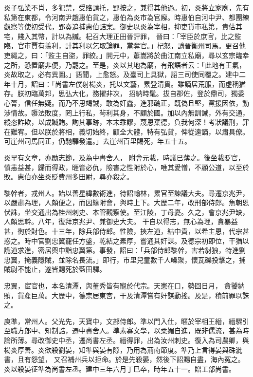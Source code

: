\begin{pinyinscope}
 炎子弘業不肖，多犯禁，受賂請托，郢按之，兼得其他過。初，炎將立家廟，先有私第在東都，令河南尹趙惠伯貨之，惠伯為炎市為官廨。時惠伯自河中尹、都團練觀察等使初受代，郢奏追捕惠伯詰案。御史以炎為宰相，抑吏貨市私第，貴估其宅，賤入其幣，計以為贓。杞召大理正田晉評罪，
 晉曰：「宰臣於庶官，比之監臨，官市賈有羨利，計其利以乞取論罪，當奪官。」杞怒，謫晉衡州司馬。更召他吏繩之，曰：「監主自盜，罪絞。」開元中，蕭嵩將於曲江南立私廟，尋以玄宗臨幸之所，恐置廟非便，乃罷之。至是，炎以其地為廟，有飛語者云：「此地有王氣，炎故取之，必有異圖。」語聞，上愈怒。及臺司上具獄，詔三司使同覆之。建中二年十月，詔曰：「尚書左僕射楊炎，托以文藝，累登清貫。雖謫居荒服，而虛稱猶存。朕初臨萬邦，思弘大化，務擢非次，
 招納時髦。拔自郡佐，登於鼎司，獨委心膂，信任無疑。而乃不思竭誠，敢為奸蠹，進邪醜正，既偽且堅，黨援因依，動涉情故。隳法敗度，罔上行私，茍利其身，不顧於國。加以內無訓誡，外有交通，縱恣詐欺，以成贓賄。詢其事跡，本末乖謬，蔑恩棄德，負我何深！考狀議刑，罪在難宥。但以朕於將相，義切始終，顧全大體，特有弘貸，俾從遠謫，以肅具僚。可崖州司馬同正，仍馳驛發遣。」去崖州百里賜死，年五十五。



 炎早有文章，亦勵志節，及為中書舍人，
 附會元載，時議已薄之。後坐載貶官，憤恚益甚，歸而得政，睚眥必仇，險害之性附於心，唯其愛憎，不顧公道，以至於敗。惠伯亦坐炎貶費州多田尉，尋亦殺之。



 黎幹者，戎州人。始以善星緯數術進，待詔翰林，累官至諫議大夫。尋遷京兆尹，以嚴肅為理，人頗便之，而因緣附會，與時上下。大歷二年，改刑部侍郎。魚朝恩伏誅，坐交通出為桂州刺史、本管觀察使。至江陵，丁母憂。久之，會京兆尹缺，人頗思幹。八年，復拜京兆尹、兼御史大夫。
 干自以得志，無心為理，貪暴益甚，徇於財色。十三年，除兵部侍郎。性險，挾左道，結中貴，以希主恩，代宗甚惑之。時中官劉忠翼寵任方盛，乾結之素厚，嘗通其奸謀。及德宗初即位，干猶以詭道求進，密居輿中詣忠翼第。事發，詔曰：「兵部侍郎黎幹，害若豺狼，特進劉忠翼，掩義隱賊，並除名長流。」即行，市里兒童數千人噪聚，懷瓦礫投擊之，捕賊尉不能止，遂皆賜死於藍田驛。



 忠翼，宦官也，本名清潭，與董秀皆有寵於代宗。天憲在口，勢回日月，
 貪饕納賄，貨產巨萬。大歷中，德宗居東宮，干及清潭嘗有奸謀動搖。及是，積前罪以誅之。



 庾準，常州人。父光先，天寶中，文部侍郎。準以門入仕，暱於宰相王縉，縉驟引至職方郎中、知制誥，遷中書舍人。準素寡文學，以柔媚自進，既非儒流，甚為時論所薄。尋改御史中丞，遷尚書左丞。縉得罪，出為汝州刺史。復入為司農卿，與楊炎厚善。炎欲殺劉晏，知準與晏有隙，乃用為荊南節度。準乃上言得晏與硃泚書，且有怨望，
 又召補州兵以拒命。於是先殺晏，然後下詔賜自盡，海內冤之。炎以殺晏征準為尚書左丞。建中三年六月丁巳卒，時年五十一。贈工部尚書。




\end{pinyinscope}
